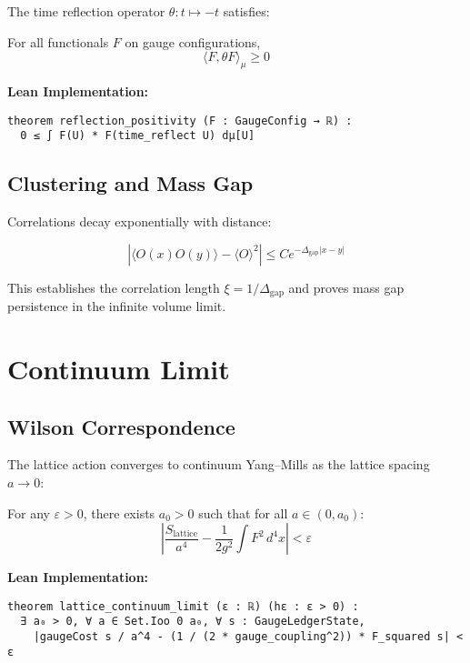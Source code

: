 \documentclass[11pt]{amsart}
\newcommand{\massGap}{\Delta_{\text{gap}}}
\begin{document}
The time reflection operator $\theta: t \mapsto -t$ satisfies:

\begin{theorem}
For all functionals $F$ on gauge configurations,
\begin{equation}
\langle F, \theta F \rangle_{\mu} \geq 0
\end{equation}
\end{theorem}

\textbf{Lean Implementation:}
\begin{lstlisting}
theorem reflection_positivity (F : GaugeConfig → ℝ) :
  0 ≤ ∫ F(U) * F(time_reflect U) dμ[U]
\end{lstlisting}

\subsection{Clustering and Mass Gap}

Correlations decay exponentially with distance:

\begin{equation}
|\langle O(x) O(y) \rangle - \langle O \rangle^2| \leq C e^{-\massGap |x-y|}
\end{equation}

This establishes the correlation length $\xi = 1/\massGap$ and proves mass gap persistence in the infinite volume limit.

\section{Continuum Limit}

\subsection{Wilson Correspondence}

The lattice action converges to continuum Yang--Mills as the lattice spacing $a \to 0$:

\begin{theorem}
For any $\varepsilon > 0$, there exists $a_0 > 0$ such that for all $a \in (0, a_0)$:
\begin{equation}
\left|\frac{S_{\text{lattice}}}{a^4} - \frac{1}{2g^2} \int F^2 \, d^4x \right| < \varepsilon
\end{equation}
\end{theorem}

\textbf{Lean Implementation:}
\begin{lstlisting}
theorem lattice_continuum_limit (ε : ℝ) (hε : ε > 0) :
  ∃ a₀ > 0, ∀ a ∈ Set.Ioo 0 a₀, ∀ s : GaugeLedgerState,
    |gaugeCost s / a^4 - (1 / (2 * gauge_coupling^2)) * F_squared s| < ε
\end{lstlisting}
\end{document}
